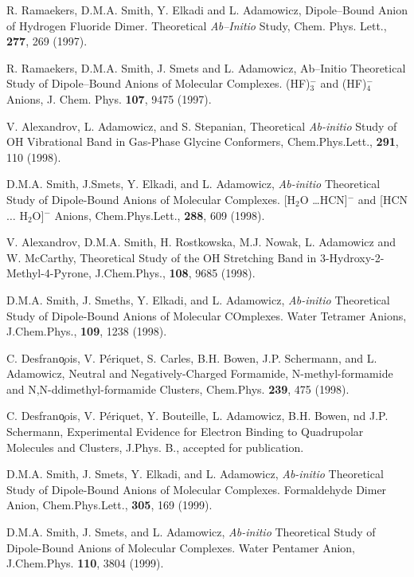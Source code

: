{{\begin{thebibliography}{999}
{
R. Ramaekers, D.M.A. Smith, Y. Elkadi and 
L. Adamowicz, Dipole--Bound Anion
of Hydrogen Fluoride Dimer.  Theoretical 
{\it Ab--Initio} Study, Chem. Phys. Lett.,
{\bf 277}, 269 (1997).

R. Ramaekers, D.M.A. Smith, J. Smets 
and L. Adamowicz, Ab--Initio Theoretical
Study of Dipole--Bound Anions of Molecular 
Complexes. (HF)$_3^-$ and (HF)$_4^-$ Anions,
J. Chem. Phys.
{\bf 107}, 9475 (1997).

V. Alexandrov, L. Adamowicz, and S. Stepanian,
Theoretical {\it Ab-initio} Study of OH Vibrational Band
in Gas-Phase Glycine Conformers, Chem.Phys.Lett.,
{\bf 291}, 110 (1998).

D.M.A. Smith, J.Smets, Y. Elkadi, and L. Adamowicz,
{\it Ab-initio} Theoretical Study of Dipole-Bound Anions
of Molecular Complexes. [H$_2$O \dots HCN]$^-$ and
[HCN $\dots$ H$_2$O]$^-$ Anions,
Chem.Phys.Lett., {\bf 288}, 609 (1998).

V. Alexandrov, D.M.A. Smith, H. Rostkowska, M.J. Nowak, 
L. Adamowicz and W. McCarthy, 
Theoretical Study of the OH Stretching Band in 3-Hydroxy-2-Methyl-4-Pyrone,
J.Chem.Phys., {\bf 108}, 9685 (1998).

D.M.A. Smith, J. Smeths, Y. Elkadi, and L. Adamowicz,
{\it Ab-initio} Theoretical Study of Dipole-Bound Anions
of Molecular COmplexes. Water Tetramer Anions,
J.Chem.Phys., {\bf 109}, 1238 (1998).


C. Desfran\c{o}ois, V. P\'{e}riquet, S. Carles, B.H. Bowen,
J.P. Schermann, and L. Adamowicz,
Neutral and Negatively-Charged Formamide, N-methyl-formamide
and N,N-ddimethyl-formamide Clusters, Chem.Phys.
{\bf 239}, 475 (1998).

C. Desfran\c{o}ois, V. P\'{e}riquet, Y. Bouteille, 
L. Adamowicz, B.H. Bowen,
nd J.P. Schermann,
Experimental Evidence for Electron Binding to
Quadrupolar Molecules and Clusters,
J.Phys. B., accepted for publication.


D.M.A. Smith, J. Smets, Y. Elkadi, and L. Adamowicz,
{\it Ab-initio} Theoretical Study of  Dipole-Bound Anions
of Molecular Complexes. Formaldehyde Dimer Anion,
Chem.Phys.Lett., {\bf 305}, 169 (1999).


D.M.A. Smith, J. Smets, and L. Adamowicz,
{\it Ab-initio} Theoretical Study of Dipole-Bound Anions of
Molecular Complexes. Water Pentamer Anion,
J.Chem.Phys. {\bf 110}, 3804 (1999).


}
\end{thebibliography}}}
